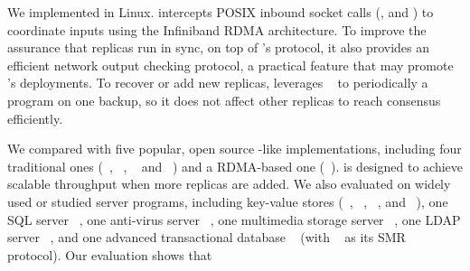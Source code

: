 


We implemented \xxx in Linux. \xxx intercepts POSIX inbound socket calls
(\eg, \accept and \recv) to coordinate inputs using the Infiniband
RDMA architecture. To improve the assurance that replicas run in sync, on top
of \xxx's \paxos protocol, it also provides an efficient network output
checking protocol, a practical feature that may promote \xxx's deployments. To
recover or add new replicas, \xxx leverages \criu~\cite{criu} to periodically a
program on one backup, so it does not affect other replicas to reach consensus
efficiently.

We compared \xxx with five popular, open source \paxos-like implementations,
including four traditional ones (\libpaxos~\cite{libpaxos},
\zookeeper~\cite{zookeeper}, \crane~\cite{crane:sosp15} and
\spaxos~\cite{spaxos}) and a RDMA-based one (\dare~\cite{dare:hpdc15}). \spaxos
is designed to achieve scalable throughput when more replicas are added. We
also evaluated \xxx on \nprog widely used or studied server programs, including
\nkvprog key-value stores (\redis~\cite{redis}, \memcached~\cite{memcached},
\ssdb~\cite{ssdb}, and \mongodb~\cite{mongodb}), one SQL server
\mysql~\cite{mysql}, one anti-virus server \clamav~\cite{clamav}, one multimedia
storage server \mediatomb~\cite{mediatomb}, one LDAP server
\openldap~\cite{openldap}, and one advanced transactional database
\calvin~\cite{calvin:sigmod12} (with \zookeeper~\cite{zookeeper} as its SMR
protocol). Our evaluation shows that


